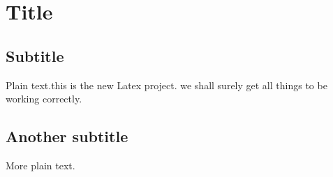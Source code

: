 \documentclass{article}
\begin{document}
\section{Title}

\subsection{Subtitle}

Plain text.this is the new Latex project. we shall surely get all things to be
working correctly.

\subsection{Another subtitle}

More plain text.
\end{document}
